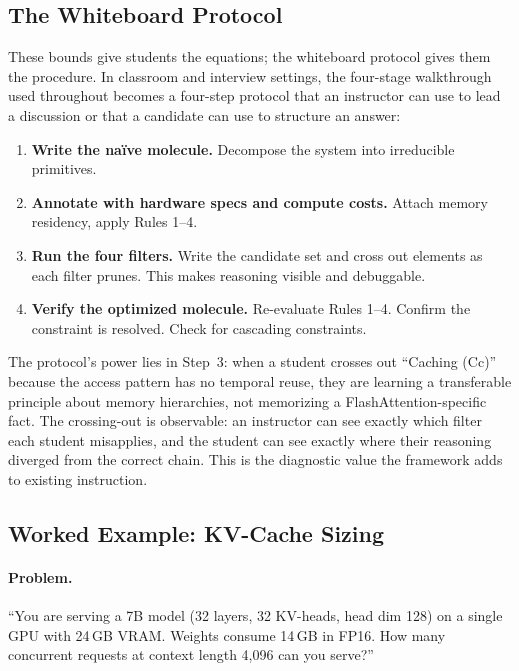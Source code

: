\documentclass[10pt,twocolumn]{article}
\begin{document}
\subsection{The Whiteboard Protocol}
\label{sec:whiteboard}

These bounds give students the equations; the whiteboard protocol gives them the procedure. In classroom and interview settings, the four-stage walkthrough used throughout  becomes a four-step protocol that an instructor can use to lead a discussion or that a candidate can use to structure an answer:

\begin{enumerate}[nosep, leftmargin=*]
\item \textbf{Write the na\"ive molecule.} Decompose the system into irreducible primitives.

\item \textbf{Annotate with hardware specs and compute costs.} Attach memory residency, apply Rules 1--4.

\item \textbf{Run the four filters.} Write the candidate set and cross out elements as each filter prunes. This makes reasoning visible and debuggable.

\item \textbf{Verify the optimized molecule.} Re-evaluate Rules 1--4. Confirm the constraint is resolved. Check for cascading constraints.
\end{enumerate}

The protocol's power lies in Step~3: when a student crosses out ``Caching (Cc)'' because the access pattern has no temporal reuse, they are learning a transferable principle about memory hierarchies, not memorizing a FlashAttention-specific fact. The crossing-out is observable: an instructor can see exactly which filter each student misapplies, and the student can see exactly where their reasoning diverged from the correct chain. This is the diagnostic value the framework adds to existing instruction.


\subsection{Worked Example: KV-Cache Sizing}
\label{sec:kv-sizing}

\paragraph{Problem.} ``You are serving a 7B model (32 layers, 32 KV-heads, head dim 128) on a single GPU with 24\,GB VRAM. Weights consume 14\,GB in FP16. How many concurrent requests at context length 4,096 can you serve?''
\end{document}
